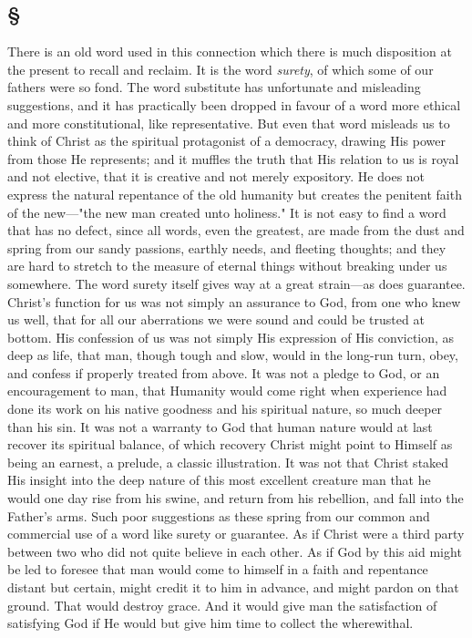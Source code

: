 \documentclass[draft]{ptfdoc}
\begin{document}
\subsection*{
\S
}

There is an old word used in this connection 
which there is much disposition at the present 
to recall and reclaim. It is the word \textit{surety}, of 
which some of our fathers were so fond. The 
word substitute has unfortunate and misleading 
suggestions, and it has practically been dropped 
in favour of a word more ethical and more constitutional, 
like representative. But even that 
word misleads us to think of Christ as the 
spiritual protagonist of a democracy, drawing 
His power from those He represents; and it 
muffles the truth that His relation to us is royal 
and not elective, that it is creative and not 
merely expository. He does not express the 
natural repentance of the old humanity but 
creates the penitent faith of the new---"the 
new man created unto holiness." It is not 
easy to find a word that has no defect, since 
all words, even the greatest, are made from 
the dust and spring from our sandy passions, 
earthly needs, and fleeting thoughts; and they 
are hard to stretch to the measure of eternal 
things without breaking under us somewhere. 
The word surety itself gives way at a great 
strain---as does guarantee. Christ's function for 
us was not simply an assurance to God, from one 
who knew us well, that for all our aberrations 
we were sound and could be trusted at bottom. 
His confession of us was not simply His 
expression of His conviction, as deep as life, 
that man, though tough and slow, would in 
the long-run turn, obey, and confess if properly 
treated from above. It was not a pledge to God, 
or an encouragement to man, that Humanity 
would come right when experience had done its 
work on his native goodness and his spiritual 
nature, so much deeper than his sin. It was not 
a warranty to God that human nature would 
at last recover its spiritual balance, of which 
recovery Christ might point to Himself as being 
an earnest, a prelude, a classic illustration. It 
was not that Christ staked His insight into the 
deep nature of this most excellent creature man 
that he would one day rise from his swine, and return 
from his rebellion, and fall into the Father's 
arms. Such poor suggestions as these spring 
from our common and commercial use of a word 
like surety or guarantee. As if Christ were a 
third party between two who did not quite believe 
in each other. As if God by this aid might be 
led to foresee that man would come to himself 
in a faith and repentance distant but certain, 
might credit it to him in advance, and might 
pardon on that ground. That would destroy 
grace. And it would give man the satisfaction 
of satisfying God if He would but give him time 
to collect the wherewithal. 
\end{document}
